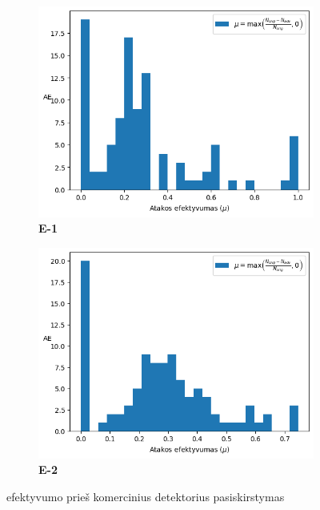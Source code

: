\begin{figure}[h]
    \begin{small}
        \begin{center}
            \begin{subfigure}[t]{0.48\textwidth}
                \centering
                \includegraphics[width=\textwidth]{img/mu_distribution_paper.png}
                \caption{\textbf{E-1}}
            \end{subfigure}
            \hfill
            \begin{subfigure}[t]{0.48\textwidth}
                \centering
                \includegraphics[width=\textwidth]{img/mu_distribution.png}
                \caption{\textbf{E-2}}
            \end{subfigure}
        \end{center}
        \caption{ efektyvumo prieš komercinius detektorius pasiskirstymas}\label{fig:experiment:mu_dist}
    \end{small}
\end{figure}

